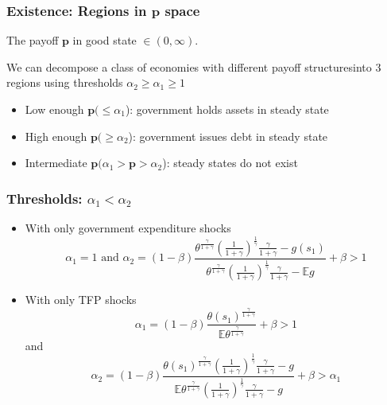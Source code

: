 \documentclass{beamer}
\newcommand{\EE}{\mathbb E}
\begin{document}
\begin{frame}
\frametitle{Existence: Regions in $\bm{p}$ space}
 
The payoff $\bm{p}$ in good state 
$\in (0,\infty)$.

We can decompose a class of economies with different payoff structuresinto 3 regions using thresholds $\alpha_2\geq\alpha_1\geq1$
 
 
 
  \begin{itemize}
   \item Low enough $\bm{p}(\leq \alpha_1$): government holds assets in steady state
   \item High enough $\bm{p} (\geq \alpha_2$): government  issues debt  in steady state
   \item Intermediate $\bm{p} (\alpha_1>\bm{p}>\alpha_2$): steady states do not exist
  \end{itemize}
 
 \end{frame}
% 
\begin{frame}
 \frametitle{Thresholds: $\alpha_1 <\alpha_2$}
	\begin{itemize}
		\item With only government expenditure shocks
		\[
			\alpha_1 = 1 \text{  and }  \alpha_2 = (1-\beta)\frac{\theta^\frac{\gamma}{1+\gamma}\left(\frac{1}{1+\gamma}\right)^\frac1\gamma\frac{\gamma}{1+\gamma}-g(s_1)}{\theta^\frac{\gamma}{1+\gamma}\left(\frac{1}{1+\gamma}\right)^\frac1\gamma\frac{\gamma}{1+\gamma}-\EE g} +\beta>1
		\]
		\item With only TFP shocks
		\[
			\alpha_1 = (1-\beta)\frac{\theta(s_1)^\frac{\gamma}{1+\gamma}}{\EE\theta^\frac{\gamma}{1+\gamma}}+\beta > 1
		\]and
		\[
		\alpha_2 = (1-\beta)\frac{\theta(s_1)^\frac{\gamma}{1+\gamma}\left(\frac{1}{1+\gamma}\right)^\frac1\gamma\frac{\gamma}{1+\gamma}-g}{\EE\theta^\frac{\gamma}{1+\gamma}\left(\frac{1}{1+\gamma}\right)^\frac1\gamma\frac{\gamma}{1+\gamma}-g}+\beta>\alpha_1
		\]
	\end{itemize}
 \end{frame}
\end{document}
